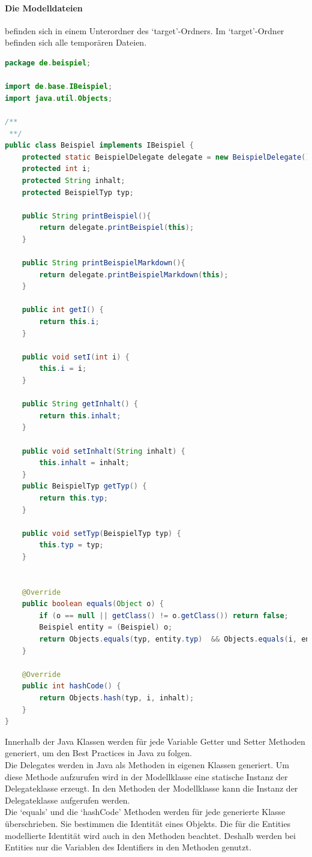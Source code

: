 \documentclass[./einleitung.tex]{subfiles}
\begin{document}
    \paragraph{Die Modelldateien} befinden sich in einem Unterordner des `target'-Ordners.
    Im `target'-Ordner befinden sich alle temporären Dateien.
    \begin{lstlisting}[language=Java, caption=Beispiel.java, label=lst:beispielJava]
package de.beispiel;

import de.base.IBeispiel;
import java.util.Objects;

/**
 **/
public class Beispiel implements IBeispiel {
    protected static BeispielDelegate delegate = new BeispielDelegate();
    protected int i;
    protected String inhalt;
    protected BeispielTyp typ;

    public String printBeispiel(){
        return delegate.printBeispiel(this);
    }

    public String printBeispielMarkdown(){
        return delegate.printBeispielMarkdown(this);
    }

    public int getI() {
        return this.i;
    }

    public void setI(int i) {
        this.i = i;
    }

    public String getInhalt() {
        return this.inhalt;
    }

    public void setInhalt(String inhalt) {
        this.inhalt = inhalt;
    }
    public BeispielTyp getTyp() {
        return this.typ;
    }

    public void setTyp(BeispielTyp typ) {
        this.typ = typ;
    }


    @Override
    public boolean equals(Object o) {
        if (o == null || getClass() != o.getClass()) return false;
        Beispiel entity = (Beispiel) o;
        return Objects.equals(typ, entity.typ)  && Objects.equals(i, entity.i)  && Objects.equals(inhalt, entity.inhalt) ;
    }

    @Override
    public int hashCode() {
        return Objects.hash(typ, i, inhalt);
    }
}
    \end{lstlisting}
    Innerhalb der Java Klassen werden für jede Variable Getter und Setter Methoden generiert, um den Best Practices in Java zu folgen.\\
    Die Delegates werden in Java als Methoden in eigenen Klassen generiert.
    Um diese Methode aufzurufen wird in der Modellklasse eine statische Instanz der Delegateklasse erzeugt.
    In den Methoden der Modellklasse kann die Instanz der Delegateklasse aufgerufen werden.\\
    Die `equals' und die `hashCode' Methoden werden für jede generierte Klasse überschrieben.
    Sie bestimmen die Identität eines Objekts.
    Die für die Entities modellierte Identität wird auch in den Methoden beachtet.
    Deshalb werden bei Entities nur die Variablen des Identifiers in den Methoden genutzt.
\end{document}
